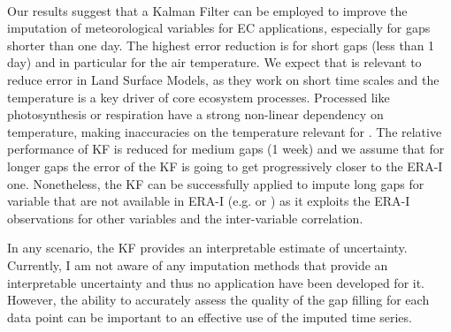 \documentclass{article}
\begin{document}
\paragraph{} Our results suggest that a Kalman Filter can be employed to improve the imputation of meteorological variables for EC applications, especially for gaps shorter than one day. 
The highest error reduction is for short gaps (less than 1 day) and  in particular for the air temperature. We expect that is relevant to reduce error in Land Surface Models, as they work on short time scales and the temperature is a key driver of core ecosystem processes. Processed like photosynthesis or respiration have a strong non-linear dependency on temperature, making inaccuracies on the temperature relevant for  \cite{bonan_climate_2019-2}.
The relative performance of KF is reduced for medium gaps (1 week) and we assume that for longer gaps the error of the KF is going to get progressively closer to the ERA-I one. Nonetheless, the KF can be successfully applied to impute long gaps for variable that are not available in ERA-I (e.g.  or ) as it exploits the ERA-I observations for other variables and the inter-variable correlation.

In any scenario, the KF provides an interpretable estimate of uncertainty. Currently, I am not aware of any imputation methods that provide an interpretable uncertainty and thus no application have been developed for it. However, the ability to accurately assess the quality of the gap filling for each data point can be important to an effective use of the imputed time series.
\end{document}
